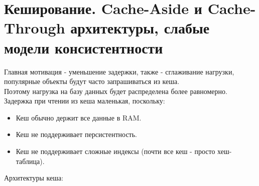\section{Кеширование. Cache-Aside и Cache-Through архитектуры, слабые модели консистентности}
    Главная мотивация - уменьшение задержки, также - сглаживание нагрузки, популярные объекты будут часто запрашиваться из кеша. \\
    Поэтому нагрузка на базу данных будет распределена более равномерно.\\
    Задержка при чтении из кеша маленькая, поскольку:\\
    \begin{itemize}
      \item Кеш обычно держит все данные в RAM.
      \item Кеш не поддерживает персистентность.
      \item Кеш не поддерживает сложные индексы (почти все кеш - просто хеш-таблица).
    \end{itemize}
    Архитектуры кеша:
